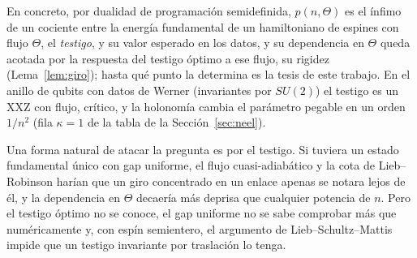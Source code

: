 \documentclass[11pt,a4paper]{article}
\theoremstyle{remark}
\begin{document}
En concreto, por dualidad de programación semidefinida, $p(n,\Theta)$ es el ínfimo de un cociente
entre la energía fundamental de un hamiltoniano de espines con flujo $\Theta$, el \emph{testigo}, y
su valor esperado en los datos, y su dependencia en $\Theta$ queda acotada por la respuesta del testigo
óptimo a ese flujo, su rigidez (Lema~\ref{lem:giro}); hasta qué punto la determina es la tesis de este trabajo. En el anillo de qubits con datos de Werner
(invariantes por $SU(2)$) el testigo es un XXZ con flujo, crítico, y la holonomía cambia el
parámetro pegable en un orden $1/n^2$ (fila $\kappa=1$ de la tabla de la Sección~\ref{sec:neel}).

Una forma natural de atacar la pregunta es por el testigo. Si tuviera un estado fundamental único
con gap uniforme, el flujo cuasi-adiabático y la cota de Lieb--Robinson \cite{bmns} harían que un
giro concentrado en un enlace apenas se notara lejos de él, y la dependencia en $\Theta$ decaería más
deprisa que cualquier potencia de $n$. Pero el testigo óptimo no se conoce, el gap uniforme no se
sabe comprobar más que numéricamente y, con espín semientero, el argumento de
Lieb--Schultz--Mattis \cite{lsm,affleck-lieb} impide que un testigo invariante por traslación lo
tenga.
\end{document}
